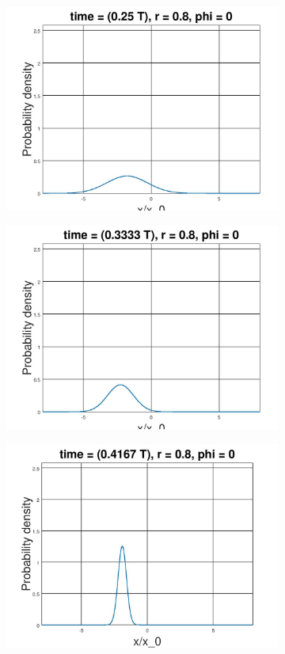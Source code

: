 \documentclass[12pt, twoside]{article}
\begin{document}
\begin{figure}[h!]
\begin{subfigure}[h!]{0.3\linewidth}
		\includegraphics[width=\linewidth]{graphs/squeeze_0.8/3.jpg}
	\end{subfigure}
	\begin{subfigure}[h!]{0.3\linewidth}
		\includegraphics[width=\linewidth]{graphs/squeeze_0.8/4.jpg}
	\end{subfigure}
	\begin{subfigure}[h!]{0.3\linewidth}
		\includegraphics[width=\linewidth]{graphs/squeeze_0.8/5.jpg}

\end{subfigure}
\end{figure}
\end{document}

